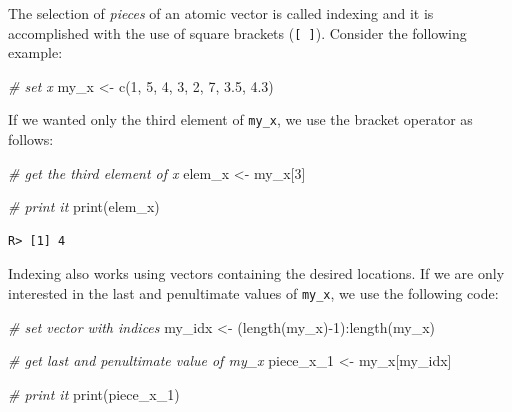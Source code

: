 \documentclass[
  12pt,
]{book}
\newenvironment{Shaded}{\begin{snugshade}}{\end{snugshade}}
\newcommand{\CommentTok}[1]{\textcolor[rgb]{0.37,0.37,0.37}{\textit{#1}}}
\newcommand{\DecValTok}[1]{\textcolor[rgb]{0.06,0.06,0.06}{#1}}
\newcommand{\FloatTok}[1]{\textcolor[rgb]{0.06,0.06,0.06}{#1}}
\newcommand{\FunctionTok}[1]{\textcolor[rgb]{0,0,0}{#1}}
\newcommand{\NormalTok}[1]{#1}
\newcommand{\OtherTok}[1]{\textcolor[rgb]{0.37,0.37,0.37}{#1}}
\newcommand{\SpecialCharTok}[1]{\textcolor[rgb]{0,0,0}{#1}}
\begin{document}
The selection of \emph{pieces} of an atomic vector is called indexing and it is accomplished with the use of square brackets (\texttt{{[}\ {]}}). Consider the following example:

\begin{Shaded}
\begin{Highlighting}[]
\CommentTok{\# set x}
\NormalTok{my\_x }\OtherTok{\textless{}{-}} \FunctionTok{c}\NormalTok{(}\DecValTok{1}\NormalTok{, }\DecValTok{5}\NormalTok{, }\DecValTok{4}\NormalTok{, }\DecValTok{3}\NormalTok{, }\DecValTok{2}\NormalTok{, }\DecValTok{7}\NormalTok{, }\FloatTok{3.5}\NormalTok{, }\FloatTok{4.3}\NormalTok{)}
\end{Highlighting}
\end{Shaded}

If we wanted only the third element of \texttt{my\_x}, we use the bracket operator as follows:

\begin{Shaded}
\begin{Highlighting}[]
\CommentTok{\# get the third element of x}
\NormalTok{elem\_x }\OtherTok{\textless{}{-}}\NormalTok{ my\_x[}\DecValTok{3}\NormalTok{]}

\CommentTok{\# print it}
\FunctionTok{print}\NormalTok{(elem\_x)}
\end{Highlighting}
\end{Shaded}

\begin{verbatim}
R> [1] 4
\end{verbatim}

Indexing also works using vectors containing the desired locations. If we are only interested in the last and penultimate values of \texttt{my\_x}, we use the following code:

\begin{Shaded}
\begin{Highlighting}[]
\CommentTok{\# set vector with indices}
\NormalTok{my\_idx }\OtherTok{\textless{}{-}}\NormalTok{  (}\FunctionTok{length}\NormalTok{(my\_x)}\SpecialCharTok{{-}}\DecValTok{1}\NormalTok{)}\SpecialCharTok{:}\FunctionTok{length}\NormalTok{(my\_x) }

\CommentTok{\# get last and penultimate value of my\_x}
\NormalTok{piece\_x\_1 }\OtherTok{\textless{}{-}}\NormalTok{ my\_x[my\_idx]}

\CommentTok{\# print it}
\FunctionTok{print}\NormalTok{(piece\_x\_1)}
\end{Highlighting}
\end{Shaded}
\end{document}
